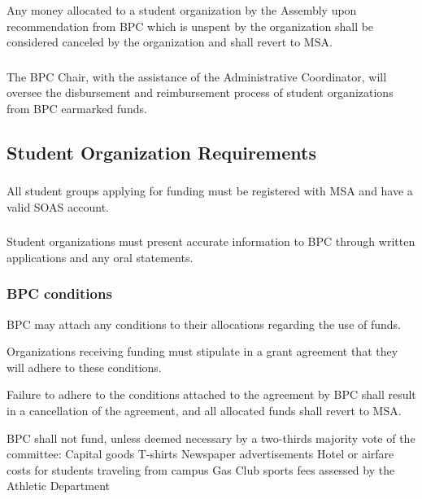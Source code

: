 \subsubsection{}
Any money allocated to a student organization by the Assembly upon recommendation from BPC which is unspent by the organization shall be considered canceled by the organization and shall revert to MSA.

\subsubsection{}
The BPC Chair, with the assistance of the Administrative Coordinator, will oversee the disbursement and reimbursement process of student organizations from BPC earmarked funds.


\subsection{Student Organization Requirements}
\subsubsection{}
All student groups applying for funding must be registered with MSA and have a valid SOAS account.

\subsubsection{}
Student organizations must present accurate information to BPC through written applications and any oral statements.

\subsubsection{BPC conditions}
\subsubsubsection{}
BPC may attach any conditions to their allocations regarding the use of funds.

\subsubsubsection{}
Organizations receiving funding must stipulate in a grant agreement that they will adhere to these conditions.

\subsubsubsection{}
Failure to adhere to the conditions attached to the agreement by BPC shall result in a cancellation of the agreement, and all allocated funds shall revert to MSA. 

\subsubsubsection{}
BPC shall not fund, unless deemed necessary by a two-thirds majority vote of the committee:
\subsubsubsubsection{}
Capital goods
\subsubsubsubsection{}
T-shirts
\subsubsubsubsection{}
Newspaper advertisements
\subsubsubsubsection{}
Hotel or airfare costs for students traveling from campus
\subsubsubsubsection{}
Gas
\subsubsubsubsection{}
Club sports fees assessed by the Athletic Department

